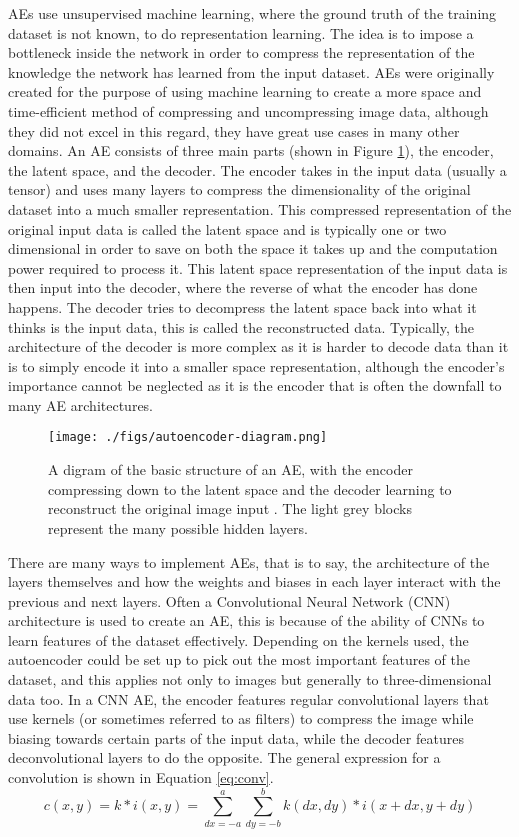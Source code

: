\documentclass[a4paper]{article}
\theoremstyle{plain}
\theoremstyle{definition}
\begin{document}
	AEs use unsupervised machine learning, where the ground truth of the training dataset is not known, to do representation learning. The idea is to impose a bottleneck inside the network in order to compress the representation of the knowledge the network has learned from the input dataset. AEs were originally created for the purpose of using machine learning to create a more space and time-efficient method of compressing and uncompressing image data, although they did not excel in this regard, they have great use cases in many other domains. An AE consists of three main parts (shown in Figure \ref{fig:ae}), the encoder, the latent space, and the decoder. The encoder takes in the input data (usually a tensor) and uses many layers to compress the dimensionality of the original dataset into a much smaller representation. This compressed representation of the original input data is called the latent space and is typically one or two dimensional in order to save on both the space it takes up and the computation power required to process it. This latent space representation of the input data is then input into the decoder, where the reverse of what the encoder has done happens. The decoder tries to decompress the latent space back into what it thinks is the input data, this is called the reconstructed data. Typically, the architecture of the decoder is more complex as it is harder to decode data than it is to simply encode it into a smaller space representation, although the encoder's importance cannot be neglected as it is the encoder that is often the downfall to many AE architectures.

	\begin{figure}[htbp]
		\centering
		\texttt{[image: ./figs/autoencoder-diagram.png]}
		\small\caption{A digram of the basic structure of an AE, with the encoder compressing down to the latent space and the decoder learning to reconstruct the original image input \cite{autoencoder-diagram}. The light grey blocks represent the many possible hidden layers.}
		\label{fig:ae}
	\end{figure}
	
	
	There are many ways to implement AEs, that is to say, the architecture of the layers themselves and how the weights and biases in each layer interact with the previous and next layers. Often a Convolutional Neural Network (CNN) architecture is used to create an AE, this is because of the ability of CNNs to learn features of the dataset effectively. Depending on the kernels used, the autoencoder could be set up to pick out the most important features of the dataset, and this applies not only to images but generally to three-dimensional data too. In a CNN AE, the encoder features regular convolutional layers that use kernels (or sometimes referred to as filters) to compress the image while biasing towards certain parts of the input data, while the decoder features deconvolutional layers to do the opposite. The general expression for a convolution is shown in Equation \ref{eq:conv}.	
	\begin{equation}
	\label{eq:conv}
		c(x, y) = k * i(x, y) = \sum_{dx = -a}^{a} \sum_{dy = -b}^{b} k(dx, dy) * i(x + dx, y + dy)
    \end{equation}
    
\end{document}
